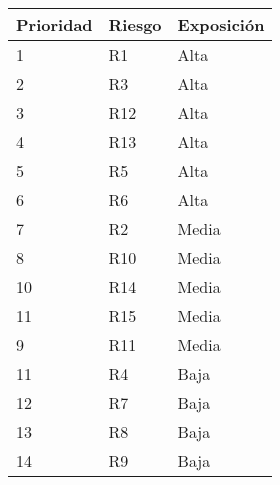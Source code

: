 \begin{center}
    \begin{tabular}{| l | l | l |}
    \hline
	Prioridad & Riesgo & Exposici\'on \\ \hline
	1 & R1 & Alta \\ \hline
	2 &	R3 & Alta \\ \hline
	3 &	R12 & Alta \\ \hline
	4 &	R13	& Alta \\ \hline
	5 &	R5 & Alta \\ \hline
	6 &	R6 & Alta \\ \hline
	7 &	R2 & Media \\ \hline
	8 &	R10 & Media \\ \hline
	10 & R14 & Media \\ \hline
	11 &  R15 & Media \\ \hline
	9 &	R11 & Media \\ \hline
	11 & R4 & Baja \\ \hline
	12 & R7 & Baja \\ \hline
	13 & R8 & Baja \\ \hline
	14 & R9 & Baja \\ \hline
    \end{tabular}
\end{center}
